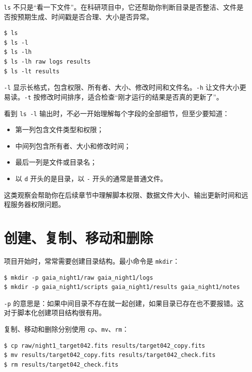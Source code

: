 \texttt{ls} 不只是“看一下文件”。在科研项目中，它还帮助你判断目录是否整洁、文件是否按预期生成、时间戳是否合理、大小是否异常。

\begin{examplebox}[常用查看方式]
\begin{lstlisting}[style=terminal]
$ ls
$ ls -l
$ ls -lh
$ ls -lh raw logs results
$ ls -lt results
\end{lstlisting}
\end{examplebox}

\texttt{-l} 显示长格式，包含权限、所有者、大小、修改时间和文件名。\texttt{-h} 让文件大小更易读。\texttt{-t} 按修改时间排序，适合检查“刚才运行的结果是否真的更新了”。

看到 \texttt{ls -l} 输出时，不必一开始理解每个字段的全部细节，但至少要知道：

\begin{itemize}
    \item 第一列包含文件类型和权限；
    \item 中间列包含所有者、大小和修改时间；
    \item 最后一列是文件或目录名；
    \item 以 \texttt{d} 开头的是目录，以 \texttt{-} 开头的通常是普通文件。
\end{itemize}

这类观察会帮助你在后续章节中理解脚本权限、数据文件大小、输出更新时间和远程服务器权限问题。

\section{创建、复制、移动和删除}

项目开始时，常常需要创建目录结构。最小命令是 \texttt{mkdir}：

\begin{examplebox}[创建项目目录结构]
\begin{lstlisting}[style=terminal]
$ mkdir -p gaia_night1/raw gaia_night1/logs
$ mkdir -p gaia_night1/scripts gaia_night1/results gaia_night1/notes
\end{lstlisting}
\end{examplebox}

\texttt{-p} 的意思是：如果中间目录不存在就一起创建，如果目录已存在也不要报错。这对于脚本化创建项目结构很有用。

复制、移动和删除分别使用 \texttt{cp}、\texttt{mv}、\texttt{rm}：

\begin{examplebox}[复制、改名与删除]
\begin{lstlisting}[style=terminal]
$ cp raw/night1_target042.fits results/target042_copy.fits
$ mv results/target042_copy.fits results/target042_check.fits
$ rm results/target042_check.fits
\end{lstlisting}
\end{examplebox}

